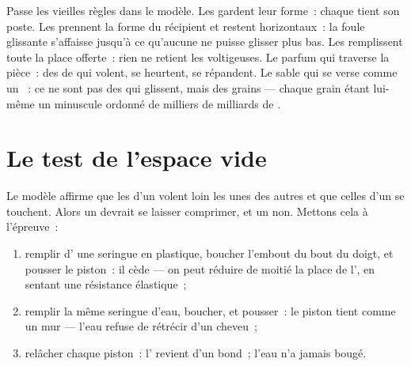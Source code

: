 \begin{example}\label{ex:g7:states-of-matter:rules}
Passe les vieilles règles dans le modèle. Les  gardent leur
forme~: chaque  tient son poste. Les  prennent la
forme du récipient et restent horizontaux~: la foule glissante
s'affaisse jusqu'à ce qu'aucune  ne puisse glisser plus bas.
Les  remplissent toute la place offerte~: rien ne retient les
voltigeuses. Le parfum qui traverse la pièce~: des  de 
qui volent, se heurtent, se répandent. Le sable qui se verse comme un
~: ce ne sont pas des  qui glissent, mais des grains
--- chaque grain étant lui-même un minuscule  ordonné de
milliers de milliards de .
\end{example}

\section{Le test de l'espace vide}

\begin{method}\label{met:g7:states-of-matter:syringe}
Le modèle affirme que les  d'un  volent loin les unes des
autres et que celles d'un  se touchent. Alors un  devrait
se laisser comprimer, et un  non. Mettons cela à l'épreuve~:
\begin{enumerate}
  \item remplir d' une seringue en plastique, boucher l'embout du
        bout du doigt, et pousser le piston~: il cède --- on peut
        réduire de moitié la place de l', en sentant une
        résistance élastique~;
  \item remplir la même seringue d'eau, boucher, et pousser~: le
        piston tient comme un mur --- l'eau refuse de rétrécir
        d'un cheveu~;
  \item relâcher chaque piston~: l' revient d'un bond~; l'eau
        n'a jamais bougé.
\end{enumerate}
\end{method}

